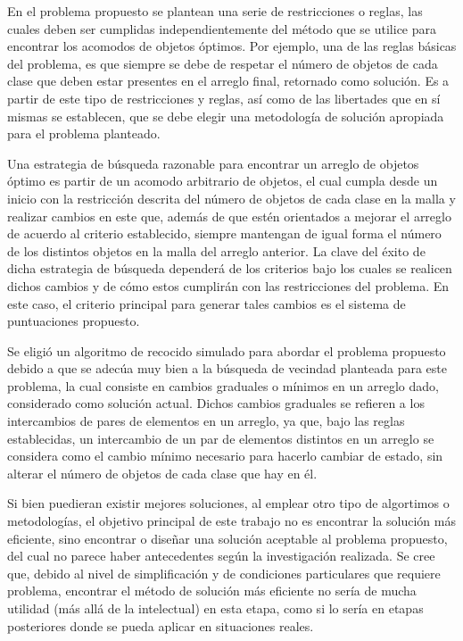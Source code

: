 En el problema propuesto se plantean una serie de restricciones o reglas, las cuales deben ser cumplidas independientemente del método que se utilice para encontrar los acomodos de objetos óptimos.
Por ejemplo, una de las reglas básicas del problema, es que siempre se debe de respetar el número de objetos de cada clase que deben estar presentes en el arreglo final, retornado como solución.
Es a partir de este tipo de restricciones y reglas, así como de las libertades que en sí mismas se establecen, que se debe elegir una metodología de solución apropiada para el problema planteado.

Una estrategia de búsqueda razonable para encontrar un arreglo de objetos óptimo es partir de un acomodo arbitrario de objetos, el cual cumpla desde un inicio con la restricción descrita del número de objetos de cada clase en la malla y realizar cambios en este que, además de que estén orientados a mejorar el arreglo de acuerdo al criterio establecido, siempre mantengan de igual forma el número de los distintos objetos en la malla del arreglo anterior.
La clave del éxito de dicha estrategia de búsqueda dependerá de los criterios bajo los cuales se realicen dichos cambios y de cómo estos cumplirán con las restricciones del problema.
En este caso, el criterio principal para generar tales cambios es el sistema de puntuaciones propuesto.

Se eligió un algoritmo de recocido simulado para abordar el problema propuesto debido a que se adecúa muy bien a la búsqueda de vecindad planteada para este problema, la cual consiste en cambios graduales o mínimos en un arreglo dado, considerado como solución actual.
Dichos cambios graduales se refieren a los intercambios de pares de elementos en un arreglo, ya que, bajo las reglas establecidas, un intercambio de un par de elementos distintos en un arreglo se considera como el cambio mínimo necesario para hacerlo cambiar de estado, sin alterar el número de objetos de cada clase que hay en él.

Si bien puedieran existir mejores soluciones, al emplear otro tipo de algortimos o metodologías, el objetivo principal de este trabajo no es encontrar la solución más eficiente, sino encontrar o diseñar una solución aceptable al problema propuesto, del cual no parece haber antecedentes según la investigación realizada.
Se cree que, debido al nivel de simplificación y de condiciones particulares que requiere problema, encontrar el método de solución más eficiente no sería de mucha utilidad (más allá de la intelectual) en esta etapa, como si lo sería en etapas posteriores donde se pueda aplicar en situaciones reales.

